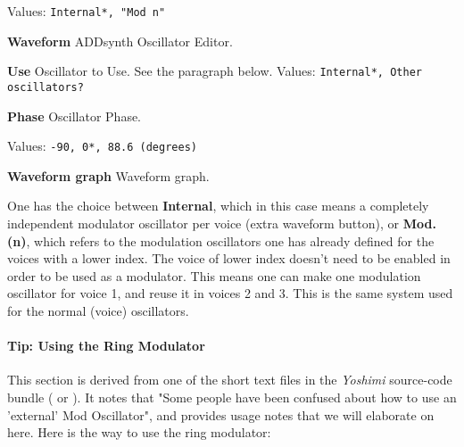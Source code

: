    Values: \texttt{Internal*, "Mod n"}

   \begin{enumber}
      \item \textbf{Waveform}
         ADDsynth Oscillator Editor.
      \item \textbf{Use}
         Oscillator to Use.
         See the paragraph below.
         Values: \texttt{Internal*, Other oscillators?}
      \item \textbf{Phase}
         Oscillator Phase.

         Values: \texttt{-90, 0*, 88.6 (degrees)}
      \item \textbf{Waveform graph}
         Waveform graph.
   \end{enumber}

   One has the choice between \textbf{Internal}, which in this case means a
   completely independent modulator oscillator per voice (extra waveform button),
   or \textbf{Mod. (n)}, which refers to the modulation oscillators one has
   already defined for the voices with a lower index.
   The voice of lower index doesn't need to be enabled in order to be used as a
   modulator. This means one can make one modulation oscillator for voice 1, and
   reuse it in voices 2 and 3.  This is the same system used for the normal (voice)
   oscillators.

\paragraph{Tip: Using the Ring Modulator}
\label{paragraph:tips_using_the_ring_modulator}

   This section is derived from one of the short text files in the
   \textsl{Yoshimi} source-code bundle (\cite{yoshimi} or \cite{yoshimi2}).
   It notes that "Some people have
   been confused about how to use an 'external' Mod Oscillator", and
   provides usage notes that we will elaborate on here.  Here is the way to
   use the ring modulator:

